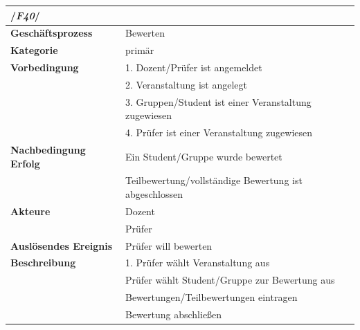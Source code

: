 	
			\begin{table}[ht]
			\begin{tabular}{ll}
				\multicolumn{2}{l}{/\textbf{\textit{F40}}/}\\\hline
				 \textbf{Geschäftsprozess} & Bewerten \\ 
				 \textbf{Kategorie} & primär \\ 
				 \textbf{Vorbedingung} & 1. Dozent/Prüfer ist angemeldet  \\ 
				 & 2. Veranstaltung ist angelegt\\
				 & 3. Gruppen/Student ist einer Veranstaltung zugewiesen\\
				 & 4. Prüfer ist einer Veranstaltung zugewiesen\\
				 \textbf{Nachbedingung Erfolg} & Ein Student/Gruppe wurde bewertet\\
				 & Teilbewertung/vollständige Bewertung ist abgeschlossen\\ 
				 \textbf{Akteure} & Dozent \\ 
				 & Prüfer\\
				 \textbf{Auslösendes Ereignis} & Prüfer will bewerten \\ 
				 \textbf{Beschreibung} &  1. Prüfer wählt Veranstaltung aus\\
				 & Prüfer wählt Student/Gruppe zur Bewertung aus\\
				 & Bewertungen/Teilbewertungen eintragen\\
				 & Bewertung abschließen\\
			
				 \end{tabular} 
			\label{tab:F40}
			\end{table}
			
